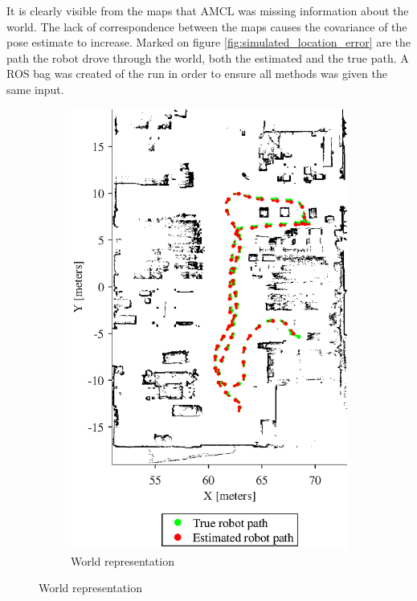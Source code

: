 It is clearly visible from the maps that AMCL was missing information about the world. The lack of correspondence between the maps causes the covariance of the pose estimate to increase.
Marked on figure \vref{fig:simulated_location_error} are the path the robot drove through the world, both the estimated and the true path.
A ROS bag was created of the run in order to ensure all methods was given the same input. 

\begin{figure}[htbp]
	\centering
	\begin{subfigure}[t]{0.45\textwidth}
		\includegraphics[width=\textwidth]{figures/static_mapping/simulation_poses_stage_map}
		\caption{World representation}

\end{subfigure}
\end{figure}
